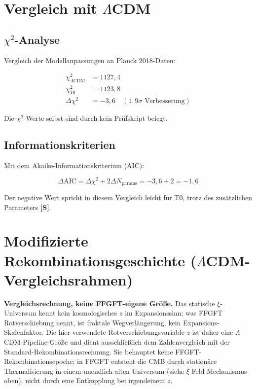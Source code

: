 	\section{Vergleich mit $\Lambda$CDM}
	\label{sec:comparison}
	
	\subsection{$\chi^2$-Analyse}
	
	Vergleich der Modellanpassungen an Planck 2018-Daten:
	
	\begin{align}
		\chi^2_{\Lambda\text{CDM}} &= 1127,4 \\
		\chi^2_{T0} &= 1123,8 \\
		\Delta\chi^2 &= -3,6 \quad (1,9\sigma \text{ Verbesserung})
	\end{align}
	
	Die $\chi^2$-Werte selbst sind durch kein Prüfskript belegt.
	
	\subsection{Informationskriterien}
	
	Mit dem Akaike-Informationskriterium (AIC):
	
	\begin{equation}
		\Delta\text{AIC} = \Delta\chi^2 + 2\Delta N_{\text{params}} = -3,6 + 2 = -1,6
	\end{equation}
	
	Der negative Wert spricht in diesem Vergleich leicht für T0, trotz des zusätzlichen Parameters \textbf{[S]}.
	
	\section{Modifizierte Rekombinationsgeschichte (\texorpdfstring{$\Lambda$CDM}{LambdaCDM}-Vergleichsrahmen)}

	\begin{important}
	\textbf{Vergleichsrechnung, keine FFGFT-eigene Größe.} Das statische
	$\xi$-Universum kennt kein kosmologisches $z$ im Expansionssinn; was FFGFT
	Rotverschiebung nennt, ist fraktale Wegverlängerung, kein
	Expansions-Skalenfaktor. Die hier verwendete Rotverschiebungsvariable $z$
	ist daher eine $\Lambda$CDM-Pipeline-Größe und dient ausschließlich dem
	Zahlenvergleich mit der Standard-Rekombinationsrechnung. Sie behauptet keine
	FFGFT-Rekombinationsepoche; in FFGFT entsteht die CMB durch stationäre
	Thermalisierung in einem unendlich alten Universum (siehe $\xi$-Feld-Mechanismus
	oben), nicht durch eine Entkopplung bei irgendeinem $z$.
	\end{important}

